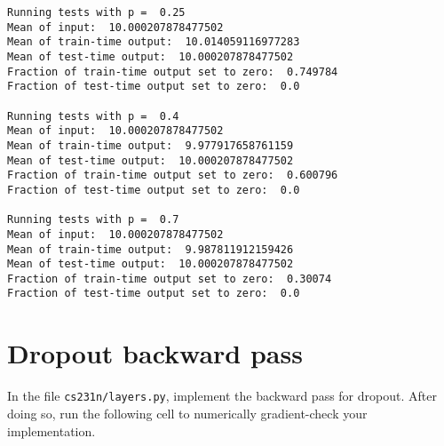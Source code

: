 \documentclass[11pt]{article}
\begin{document}
    \begin{Verbatim}[commandchars=\\\{\}]
Running tests with p =  0.25
Mean of input:  10.000207878477502
Mean of train-time output:  10.014059116977283
Mean of test-time output:  10.000207878477502
Fraction of train-time output set to zero:  0.749784
Fraction of test-time output set to zero:  0.0

Running tests with p =  0.4
Mean of input:  10.000207878477502
Mean of train-time output:  9.977917658761159
Mean of test-time output:  10.000207878477502
Fraction of train-time output set to zero:  0.600796
Fraction of test-time output set to zero:  0.0

Running tests with p =  0.7
Mean of input:  10.000207878477502
Mean of train-time output:  9.987811912159426
Mean of test-time output:  10.000207878477502
Fraction of train-time output set to zero:  0.30074
Fraction of test-time output set to zero:  0.0

    \end{Verbatim}

    \hypertarget{dropout-backward-pass}{%
\section{Dropout backward pass}\label{dropout-backward-pass}}

In the file \texttt{cs231n/layers.py}, implement the backward pass for
dropout. After doing so, run the following cell to numerically
gradient-check your implementation.
\end{document}
